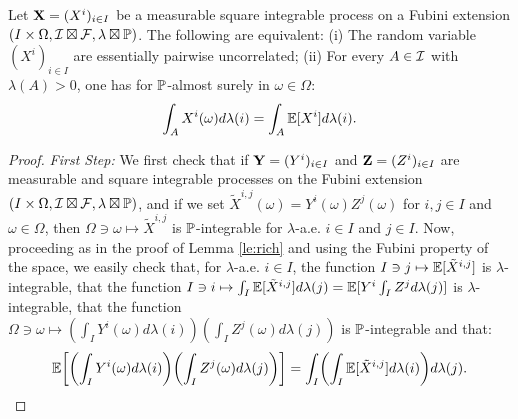 \begin{theorem}
	\label{th:exact_LLN}
	Let $\mathbf{X}=(X^i)_{i\in I}$ be a measurable square integrable process on a Fubini extension $(I\times\Omega,{\cal I}\boxtimes{\cal F},\lambda\boxtimes\mathbb{P})$. The following are equivalent:
	\vskip 1pt
	(i) The random variable $(X^i)_{i\in I}$ are essentially pairwise uncorrelated;
	\vskip 1pt
	(ii) For every $A\in{\cal I}$ with $\lambda(A)>0$, one has for $\mathbb{P}$-almost surely in $\omega\in\Omega$:
	$$
	\int_AX^i(\omega) d\lambda(i)=\int_A\mathbb{E}[X^i] d\lambda(i).
	$$
\end{theorem}
\begin{proof}
	\emph{First Step:}
	We first check that if $\mathbf{Y}=(Y^i)_{i\in I}$ and  $\mathbf{Z}=(Z^i)_{i\in I}$ are measurable and square integrable processes on the Fubini extension
	$(I\times\Omega,{\cal I}\boxtimes{\cal F},\lambda\boxtimes\mathbb{P})$, and if we set
	$\tilde{X}^{i,j}(\omega)=Y^i(\omega)Z^j(\omega)$ for $i,j\in I$ and $\omega\in\Omega$, then $\Omega \ni \omega \mapsto \tilde{X}^{i,j}$ is $\mathbb{P}$-integrable for $\lambda$-a.e. $i\in I$ and $j\in I$.
	Now, 
	proceeding as in the proof of Lemma 
	\ref{le:rich}
	and
	using the Fubini property of the space, we easily check that, for $\lambda$-a.e. $i\in I$, the function $I \ni j\mapsto \mathbb{E}[ \tilde{X}^{i,j}]$ is $\lambda$-integrable, that the function
	$I\ni i\mapsto \int_I
	\mathbb{E}[ \tilde{X}^{i,j}]d\lambda(j) = \mathbb{E} [Y^i \int_{I} Z^{j} d\lambda(j)]$ is $\lambda$-integrable, that
	the function 
	$\Omega\ni \omega\mapsto 
	(\int_I Y^i(\omega)d\lambda(i))(\int_I Z^j(\omega)d\lambda(j))
	$
	is $\mathbb{P}$-integrable and that:
	\begin{equation}
	\label{fo:fs}
	\mathbb{E}\biggl[\biggl(\int_I Y^i(\omega)d\lambda(i)\biggr)\biggl(\int_I Z^j(\omega)d\lambda(j)\biggr)\biggr]
	=\int_I\biggl(\int_I\mathbb{E}[ \tilde{X}^{i,j}]d\lambda(i)\biggr)d\lambda(j).
	\end{equation}
	

\end{proof}
